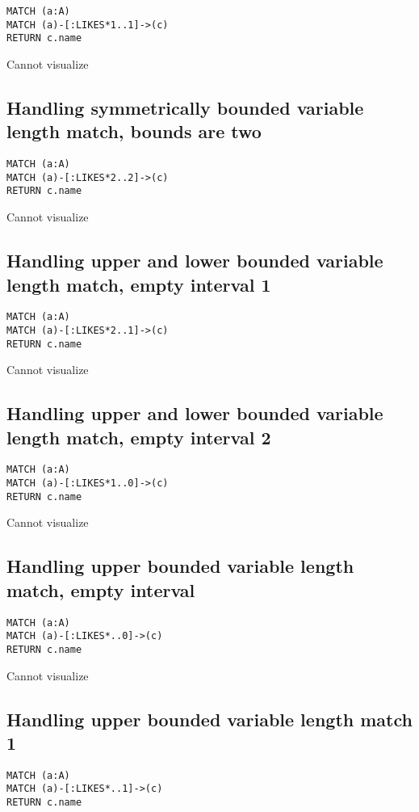 \begin{lstlisting}
MATCH (a:A)
MATCH (a)-[:LIKES*1..1]->(c)
RETURN c.name
\end{lstlisting}

Cannot visualize
\subsection{Handling symmetrically bounded variable length match, bounds are two}

\begin{lstlisting}
MATCH (a:A)
MATCH (a)-[:LIKES*2..2]->(c)
RETURN c.name
\end{lstlisting}

Cannot visualize
\subsection{Handling upper and lower bounded variable length match, empty interval 1}

\begin{lstlisting}
MATCH (a:A)
MATCH (a)-[:LIKES*2..1]->(c)
RETURN c.name
\end{lstlisting}

Cannot visualize
\subsection{Handling upper and lower bounded variable length match, empty interval 2}

\begin{lstlisting}
MATCH (a:A)
MATCH (a)-[:LIKES*1..0]->(c)
RETURN c.name
\end{lstlisting}

Cannot visualize
\subsection{Handling upper bounded variable length match, empty interval}

\begin{lstlisting}
MATCH (a:A)
MATCH (a)-[:LIKES*..0]->(c)
RETURN c.name
\end{lstlisting}

Cannot visualize
\subsection{Handling upper bounded variable length match 1}

\begin{lstlisting}
MATCH (a:A)
MATCH (a)-[:LIKES*..1]->(c)
RETURN c.name
\end{lstlisting}

